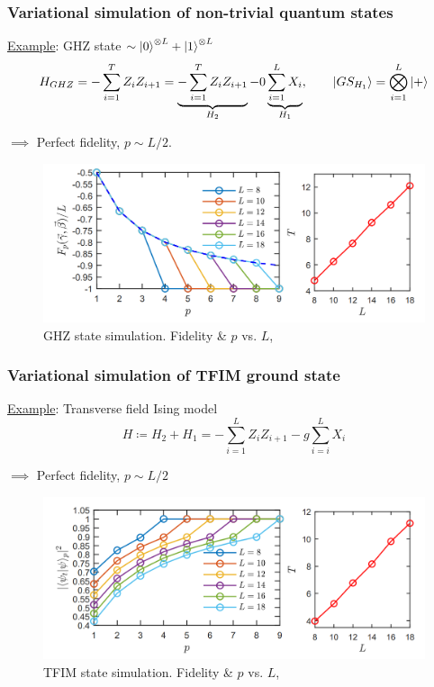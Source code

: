 \documentclass{beamer}
\theoremstyle{definition}
\begin{document}
\begin{frame}
\frametitle{Variational simulation of non-trivial quantum states}

\underline{Example}: GHZ state $\sim \left\vert{0}\right\rangle^{\otimes L} + \left\vert{1}\right\rangle^{\otimes L} $ 
\begin{equation*}
H_{GHZ} = -\sum^T_{i=1}Z_i Z_{i+1} = \underbrace{-\sum^T_{i=1}Z_i Z_{i+1}}_{H_2} - 0\underbrace{\sum^L_{i=1}X_i}_{H_1}, \qquad \left\vert{GS_{H_1}}\right\rangle = \bigotimes^L_{i=1} \left\vert{+}\right\rangle
\end{equation*}

$\implies$ Perfect fidelity, $p \sim L/2$.

\begin{figure}[!htb]
	\centering
	\includegraphics[scale=0.25]{ghz1}
	\caption{GHZ state simulation. Fidelity \& $p$ vs. $L$, \cite{VQCS}}
\end{figure}

\end{frame}




\begin{frame}
\frametitle{Variational simulation of TFIM ground state}

\underline{Example}: Transverse field Ising model
\begin{equation*}
H \coloneqq H_2 + H_1 =  - \sum_{i=1}^L Z_i Z_{i+1} - g\sum^L_{i=i}X_i
\end{equation*}

$\implies$ Perfect fidelity, $p\sim L/2$
\begin{figure}[!htb]
	\centering
	\includegraphics[scale=0.25]{tfim}
	\caption{TFIM state simulation. Fidelity \& $p$ vs. $L$, \cite{VQCS}}
\end{figure}






\end{frame}
\end{document}

